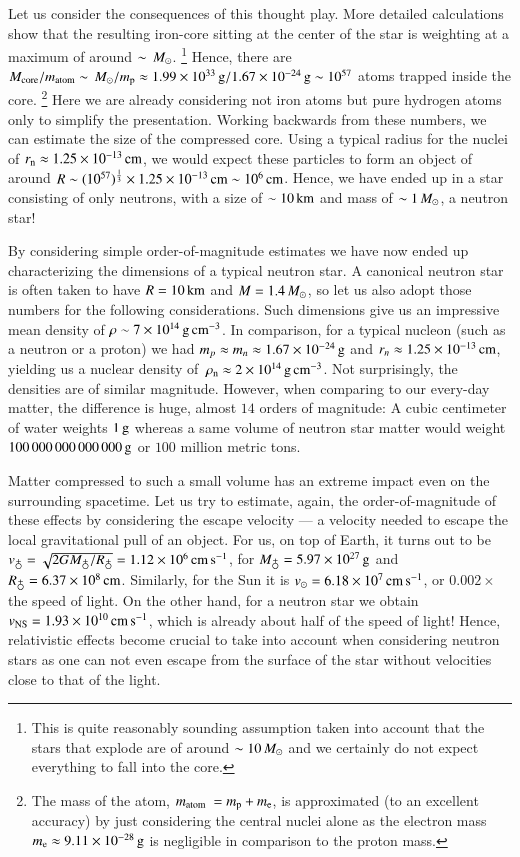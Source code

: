 Let us consider the consequences of this thought play.
More detailed calculations show that the resulting iron-core sitting at the center of the star is weighting at a maximum of around $\sim \, M_{\odot}$.%
\footnote{This is quite reasonably sounding assumption taken into account that the stars that explode are of around $\sim10\, M_{\odot}$ and we certainly do not expect everything to fall into the core.
}
Hence, there are $M_{\mathrm{core}} / m_{\mathrm{atom}} \sim \, M_{\odot} / m_{\mathrm{p}} \approx 1.99 \times 10^{33} \, \mathrm{g} / 1.67 \times 10^{-24} \, \mathrm{g} \sim 10^{57}$ atoms trapped inside the core.
\footnote{
    The mass of the atom, $m_{\mathrm{atom}} = \mproton + \me$, is approximated (to an excellent accuracy) by just considering the central nuclei alone as the electron mass $m_{\mathrm{e}} \approx 9.11 \times 10^{-28} \, \mathrm{g}$ is negligible in comparison to the proton mass.
}
Here we are already considering not iron atoms but pure hydrogen atoms only to simplify the presentation.
Working backwards from these numbers, we can estimate the size of the compressed core.
Using a typical radius for the nuclei of $r_{\mathrm{n}} \approx 1.25 \times 10^{-13}\, \mathrm{cm}$, we would expect these particles to form an object of around $R \sim (10^{57})^{\frac{1}{3}} \times 1.25 \times 10^{-13}\, \mathrm{cm} \sim 10^6 \, \mathrm{cm}$.
Hence, we have ended up in a star consisting of only neutrons, with a size of $\sim 10\, \mathrm{km}$ and mass of $\sim 1\, M_{\odot}$, a neutron star!

By considering simple order-of-magnitude estimates we have now ended up characterizing the dimensions of a typical neutron star.
A canonical neutron star is often taken to have $R=10\, \mathrm{km}$ and $M=1.4\, M_{\odot}$, so let us also adopt those numbers for the following considerations.
Such dimensions give us an impressive mean density of $\rho \sim 7 \times 10^{14} \, \mathrm{g}\,\mathrm{cm}^{-3}$.
In comparison, for a typical nucleon (such as a neutron or a proton) we had $m_{p} \approx m_{n} \approx 1.67 \times 10^{-24} \, \mathrm{g}$ and $r_{n} \approx 1.25 \times 10^{-13} \, \mathrm{cm}$, yielding us a nuclear density of $\, \rho_{\mathrm{n}}  \approx 2 \times 10^{14} \, \mathrm{g}\,\mathrm{cm}^{-3}$.
Not surprisingly, the densities are of similar magnitude.
However, when comparing to our every-day matter, the difference is huge, almost $14$ orders of magnitude:
A cubic centimeter of water weights $1\, \mathrm{g}$ whereas a same volume of neutron star matter would weight $100\,000\,000\,000\,000\, \mathrm{g}$ or $100$ million metric tons.


Matter compressed to such a small volume has an extreme impact even on the surrounding spacetime.
Let us try to estimate, again, the order-of-magnitude of these effects by considering the escape velocity --- a velocity needed to escape the local gravitational pull of an object.
For us, on top of Earth, it turns out to be $v_{\mathrm{\earth}} = \sqrt{2G M_{\earth} / R_{\earth}} = \Ten{1.12}{6} \cms$, for $M_{\earth} = \Ten{5.97}{27} \g$ and $R_{\earth} = \Ten{6.37}{8} \cm$.
Similarly, for the Sun it is $v_{\odot} = 6.18 \times 10^{7} \, \mathrm{cm}\,\mathrm{s}^{-1}$, or $0.002 \times$ the speed of light.
On the other hand, for a neutron star we obtain $v_{\mathrm{NS}} = 1.93 \times 10^{10} \, \mathrm{cm}\,\mathrm{s}^{-1}$, which is already about half of the speed of light!
Hence, relativistic effects become crucial to take into account when considering neutron stars as one can not even escape from the surface of the star without velocities close to that of the light.


